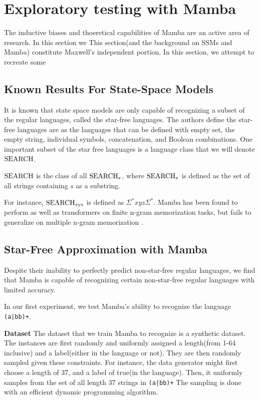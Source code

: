\section{Exploratory testing with Mamba}
The inductive biases and thoeretical capabilities of Mamba are an active area of
research. In this section we 
This section(and the background on SSMs and Mamba) constitute Maxwell's
independent portion. In this section, we attempt to recreate some

\subsection{Known Results For State-Space Models}
It is known that state space models are only capable of recognizing a subset of
the regular languages\cite{ssmformal}, called the star-free languages.
The authors define the star-free languages are as the languages that can be
defined with empty set, the empty string, individual symbols, concatenation, and
Boolean combinations.
One important subset of the star free languages is a language class that we will
denote ${\text{SEARCH}}$.
\begin{definition}
    ${\text{SEARCH}}$ is the class of all ${\text{SEARCH}}_{s}$, where ${\text{SEARCH}}_{s}$ is defined
    as the set of all strings containing $s$ as a substring.
\end{definition}
For instance, ${\text{SEARCH}}_{\text{xyz}}$ is defined as $\Sigma^{*}xyz\Sigma^{*}$.
Mamba has been found to perform as well as transformers on finite n-gram
memorization tasks, but fails to generalize on multiple n-gram memorization
\cite{mambangram}.

\subsection{Star-Free Approximation with Mamba}
Despite their inability to perfectly predict non-star-free regular languages,
we find that Mamba is capable of recognizing certain non-star-free regular
languages with limited accuracy.

In our first experiment, we test Mamba's ability to recognize the language
\texttt{(a|bb)+}.

\textbf{Dataset} The dataset that we train Mamba to recognize is a synthetic
dataset.
The instances are first randomly and uniformly assigned a length(from 1-64
inclusive) and a label(either in the language or not).
They are then randomly sampled given these constraints.
For instance, the data generator might first choose a length of 37, and a label
of true(in the language).
Then, it uniformly samples from the set of all length 37 strings in
\texttt{(a|bb)+}
The sampling is done with an efficient dynamic programming algorithm.

